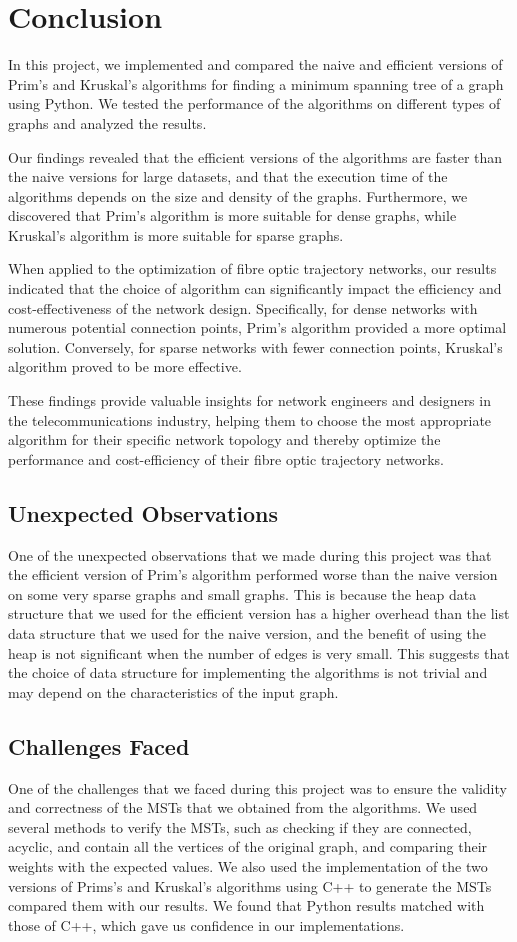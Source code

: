 \documentclass[a4paper, 10pt, twocolumn]{article}
\begin{document}
\section{Conclusion}
In this project, we implemented and compared the naive and efficient versions of Prim’s and Kruskal’s algorithms for finding a minimum spanning tree of a graph using Python. We tested the performance of the algorithms on different types of graphs and analyzed the results. 

Our findings revealed that the efficient versions of the algorithms are faster than the naive versions for large datasets, and that the execution time of the algorithms depends on the size and density of the graphs. Furthermore, we discovered that Prim’s algorithm is more suitable for dense graphs, while Kruskal’s algorithm is more suitable for sparse graphs.

When applied to the optimization of fibre optic trajectory networks, our results indicated that the choice of algorithm can significantly impact the efficiency and cost-effectiveness of the network design. Specifically, for dense networks with numerous potential connection points, Prim’s algorithm provided a more optimal solution. Conversely, for sparse networks with fewer connection points, Kruskal’s algorithm proved to be more effective. 

These findings provide valuable insights for network engineers and designers in the telecommunications industry, helping them to choose the most appropriate algorithm for their specific network topology and thereby optimize the performance and cost-efficiency of their fibre optic trajectory networks.
\subsection{Unexpected Observations}
One of the unexpected observations that we made during this project was that the efficient version of Prim’s algorithm performed worse than the naive version on some very sparse graphs and small graphs. This is because the heap data structure that we used for the efficient version has a higher overhead than the list data structure that we used for the naive version, and the benefit of using the heap is not significant when the number of edges is very small. This suggests that the choice of data structure for implementing the algorithms is not trivial and may depend on the characteristics of the input graph.
\subsection{Challenges Faced}
One of the challenges that we faced during this project was to ensure the validity and correctness of the MSTs that we obtained from the algorithms. We used several methods to verify the MSTs, such as checking if they are connected, acyclic, and contain all the vertices of the original graph, and comparing their weights with the expected values. We also used the implementation of the two versions of Prims's and Kruskal's algorithms using C++ to generate the MSTs compared them with our results. We found that Python results matched with those of C++, which gave us confidence in our implementations.
\end{document}
